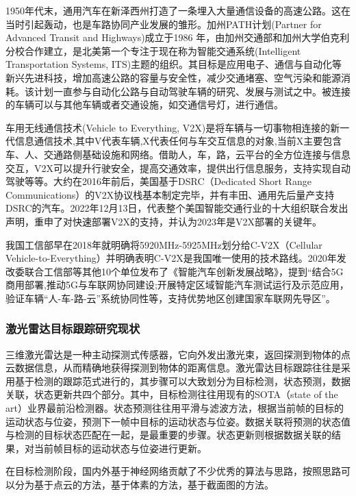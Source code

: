 1950年代末，通用汽车在新泽西州打造了一条埋入大量通信设备的高速公路。这在当时引起轰动，也是车路协同产业发展的雏形。加州PATH计划(Partner for Advanced Transit and Highways)成立于1986 年，由加州交通部和加州大学伯克利分校合作建立，是北美第一个专注于现在称为智能交通系统(Intelligent Transportation Systems, ITS)主题的组织。其目标是应用电子、通信与自动化等新兴先进科技，增加高速公路的容量与安全性，减少交通堵塞、空气污染和能源消耗。该计划一直参与自动化公路与自动驾驶车辆的研究、发展与测试之中。被连接的车辆可以与其他车辆或者交通设施，如交通信号灯，进行通信\cite{xinyanan2022}。

车用无线通信技术(Vehicle to Everything, V2X)是将车辆与一切事物相连接的新一代信息通信技术,其中V代表车辆,X代表任何与车交互信息的对象,当前X主要包含车、人、交通路侧基础设施和网络。借助人，车，路，云平台的全方位连接与信息交互，V2X可以提升行驶安全，提高交通效率，提供出行信息服务，支持实现自动驾驶等等。大约在2016年前后，美国基于DSRC（Dedicated Short Range Communications）的V2X协议栈基本制定完毕，并有丰田、通用先后量产支持DSRC的汽车。2022年12月13日，代表整个美国智能交通行业的十大组织联合发出声明，重申了对快速部署V2X的支持，并认为2023年是V2X部署的关键年。

我国工信部早在2018年就明确将5920MHz-5925MHz划分给C-V2X（Cellular Vehicle-to-Everything）并明确表明C-V2X是我国唯一使用的技术路线。2020年发改委联合工信部等其他10个单位发布了《智能汽车创新发展战略》\cite{zhineng}，提到“结合5G商用部署,推动5G与车联网协同建设;开展特定区域智能汽车测试运行及示范应用，验证车辆“人-车-路-云”系统协同性等，支持优势地区创建国家车联网先导区”。

\subsubsection{激光雷达目标跟踪研究现状}

三维激光雷达是一种主动探测式传感器，它向外发出激光束，返回探测到物体的点云数据信息，从而精确地获得探测到物体的距离信息。激光雷达目标跟踪往往是采用基于检测的跟踪范式进行的，其步骤可以大致划分为目标检测，状态预测，数据关联，状态更新共四个部分。其中，目标检测往往用现有的SOTA（state of the art）业界最前沿检测器。状态预测往往用平滑与滤波方法，根据当前帧的目标的运动状态与位姿，预测下一帧中目标的运动状态与位姿。数据关联将预测的状态值与检测的目标状态匹配在一起，是最重要的步骤。状态更新则根据数据关联的结果，对当前帧目标的运动状态与位姿进行更新。

在目标检测阶段，国内外基于神经网络贡献了不少优秀的算法与思路，按照思路可以分为基于点云的方法，基于体素的方法，基于截面图的方法。\cite{mao20223d}

